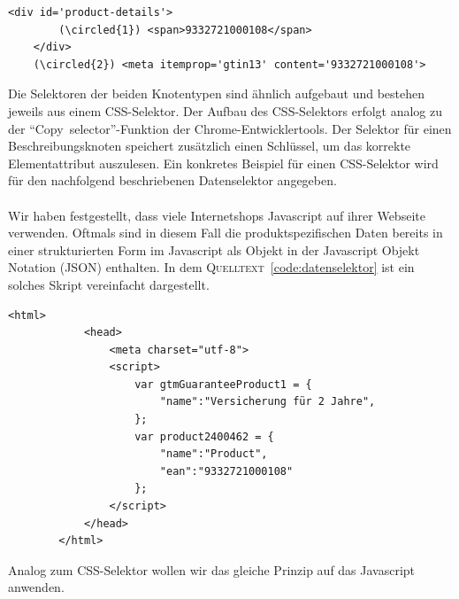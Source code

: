 \vspace{0.25cm}
\begin{lstlisting}[label={code:text-und-beschreibungsknoten}]
    <div id='product-details'>
        (\circled{1}) <span>9332721000108</span>
    </div>
    (\circled{2}) <meta itemprop='gtin13' content='9332721000108'>
\end{lstlisting}
\vspace{-0.25cm}
\vspace{0.25cm}
Die Selektoren der beiden Knotentypen sind ähnlich aufgebaut und bestehen jeweils aus einem CSS-Selektor.
Der Aufbau des CSS-Selektors erfolgt analog zu der ``Copy~selector''-Funktion der Chrome-Entwicklertools.
Der Selektor für einen Beschreibungsknoten speichert zusätzlich einen Schlüssel, um das korrekte Elementattribut
auszulesen.
Ein konkretes Beispiel für einen CSS-Selektor wird für den nachfolgend beschriebenen Datenselektor angegeben.
\\
~\\
Wir haben festgestellt, dass viele Internetshops Javascript auf ihrer Webseite verwenden.
Oftmals sind in diesem Fall die produktspezifischen Daten bereits in einer strukturierten Form im Javascript
als Objekt in der Javascript Objekt Notation (JSON) enthalten.
In dem \textsc{Quelltext}~\ref{code:datenselektor} ist ein solches Skript vereinfacht dargestellt.

\vspace{0.25cm}
\begin{minipage}[c]{\textwidth} %
    \begin{lstlisting}[label={code:datenselektor}]
        <html>
            <head>
                <meta charset="utf-8">
                <script>
                    var gtmGuaranteeProduct1 = {
                        "name":"Versicherung für 2 Jahre",
                    };
                    var product2400462 = {
                        "name":"Product",
                        "ean":"9332721000108"
                    };
                </script>
            </head>
        </html>
    \end{lstlisting}
    \vspace{-0.25cm}
    \vspace{0.25cm}
\end{minipage}
Analog zum CSS-Selektor wollen wir das gleiche Prinzip auf das Javascript anwenden.

